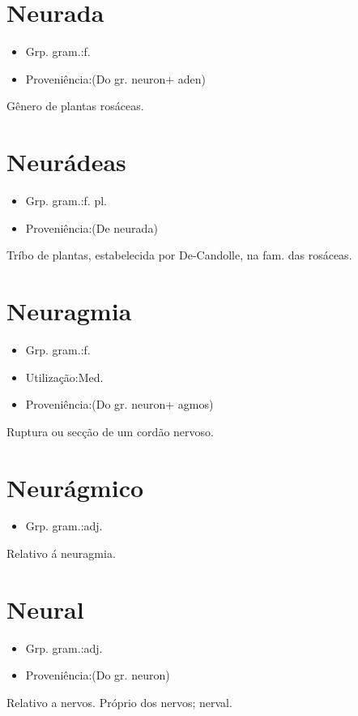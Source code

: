 \section{Neurada}
\begin{itemize}
\item {Grp. gram.:f.}
\end{itemize}
\begin{itemize}
\item {Proveniência:(Do gr. \textunderscore neuron\textunderscore  + \textunderscore aden\textunderscore )}
\end{itemize}
Gênero de plantas rosáceas.
\section{Neurádeas}
\begin{itemize}
\item {Grp. gram.:f. pl.}
\end{itemize}
\begin{itemize}
\item {Proveniência:(De \textunderscore neurada\textunderscore )}
\end{itemize}
Tríbo de plantas, estabelecida por De-Candolle, na fam. das rosáceas.
\section{Neuragmia}
\begin{itemize}
\item {Grp. gram.:f.}
\end{itemize}
\begin{itemize}
\item {Utilização:Med.}
\end{itemize}
\begin{itemize}
\item {Proveniência:(Do gr. \textunderscore neuron\textunderscore  + \textunderscore agmos\textunderscore )}
\end{itemize}
Ruptura ou secção de um cordão nervoso.
\section{Neurágmico}
\begin{itemize}
\item {Grp. gram.:adj.}
\end{itemize}
Relativo á neuragmia.
\section{Neural}
\begin{itemize}
\item {Grp. gram.:adj.}
\end{itemize}
\begin{itemize}
\item {Proveniência:(Do gr. \textunderscore neuron\textunderscore )}
\end{itemize}
Relativo a nervos.
Próprio dos nervos; nerval.
